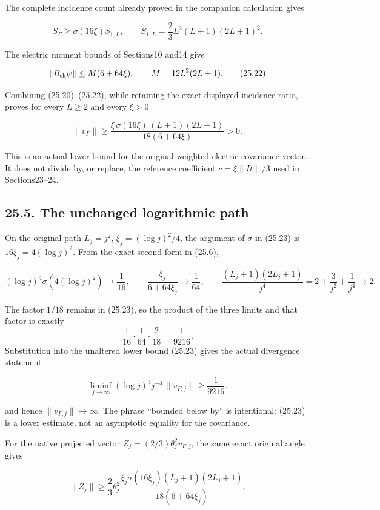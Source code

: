 \documentclass[
]{article}
\begin{document}
The complete incidence count already proved in the companion calculation
gives

\[
 S_\Gamma\ge\sigma(16\xi)S_{1,L},
 \qquad
 S_{1,L}=\frac23L^2(L+1)(2L+1)^2.
 \tag{25.21}
\]

The electric moment bounds of Sections10 and14 give

\[
 \|B_{\rm sk}\psi\|\le M(6+64\xi),
 \qquad
 M=12L^2(2L+1).
 \tag{25.22}
\]

Combining (25.20)--(25.22), while retaining the exact displayed
incidence ratio, proves for every \(L\ge2\) and every \(\xi>0\)

\[
 \boxed{\displaystyle
 \|v_\Gamma\|\ge
 \frac{\xi\,\sigma(16\xi)\,(L+1)(2L+1)}
 {18(6+64\xi)}>0.}
 \tag{25.23}
\]

This is an actual lower bound for the original weighted electric
covariance vector. It does not divide by, or replace, the reference
coefficient \(c=\xi\|I t\|/3\) used in Sections23--24.

\subsection{25.5. The unchanged logarithmic
path}\label{the-unchanged-logarithmic-path}

On the original path \(L_j=j^2\), \(\xi_j=(\log j)^2/4\), the argument
of \(\sigma\) in (25.23) is \(16\xi_j=4(\log j)^2\). From the exact
second form in (25.6),

\[
 (\log j)^4\sigma(4(\log j)^2)\longrightarrow\frac1{16},
 \qquad
 \frac{\xi_j}{6+64\xi_j}\longrightarrow\frac1{64},
 \qquad
 \frac{(L_j+1)(2L_j+1)}{j^4}
 =2+\frac3{j^2}+\frac1{j^4}\longrightarrow2.
 \tag{25.24}
\]

The factor \(1/18\) remains in (25.23), so the product of the three
limits and that factor is exactly \[
\frac1{16}\cdot\frac1{64}\cdot\frac2{18}=\frac1{9216}.
\] Substitution into the unaltered lower bound (25.23) gives the actual
divergence statement

\[
 \boxed{\displaystyle
 \liminf_{j\to\infty}(\log j)^4j^{-4}\,\|v_{\Gamma,j}\|
 \ge\frac1{9216}.}
 \tag{25.25}
\]

and hence \(\|v_{\Gamma,j}\|\to\infty\). The phrase ``bounded below by''
is intentional: (25.23) is a lower estimate, not an asymptotic equality
for the covariance.

For the native projected vector \(Z_j=(2/3)\theta_j^2v_{\Gamma,j}\), the
same exact original angle gives

\[
 \|Z_j\|\ge\frac23\theta_j^2
 \frac{\xi_j\sigma(16\xi_j)(L_j+1)(2L_j+1)}{18(6+64\xi_j)}.
 \tag{25.26}
\]
\end{document}
